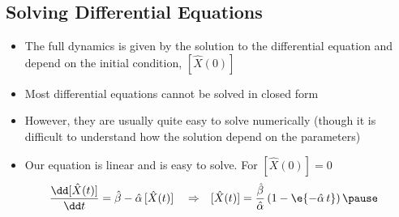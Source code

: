 \begin{slide}
\section[-1]{Solving Differential Equations}

\begin{PauseHighLight}
  \begin{itemize}
  \item The full dynamics is given by the solution to the differential
    equation and depend on the initial condition, $[\hat{X}(0)]$\pause
  \item Most differential equations cannot be solved in closed
    form\pause
  \item However, they are usually quite easy to solve numerically
    (though it is difficult to understand how the solution depend on the
    parameters)\pause
  \item Our equation is linear and is easy to solve.\pause{}  For $[\hat{X}(0)]=0$
    \begin{align*}
      \frac{\dd [\hat{X}(t)]}{\dd t} &= \hat{\beta} - \hat{\alpha}\,[\hat{X}(t)]
      & &\Rightarrow&
     [\hat{X}(t)] &= \frac{\hat{\beta}}{\hat{\alpha}}
                      \left( 1- \e{-\hat{\alpha}\,t} \right)\pause
    \end{align*}
  \end{itemize}
\end{PauseHighLight}

\end{slide}


